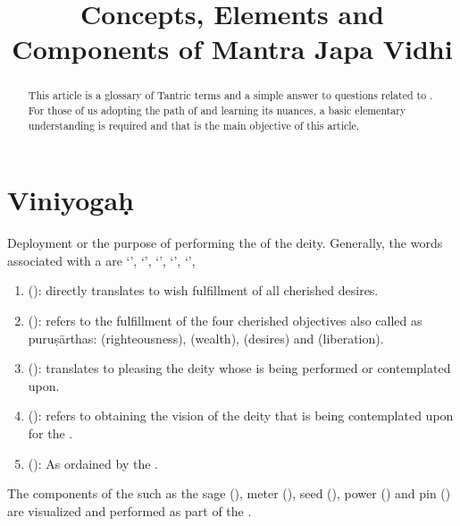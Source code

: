 \documentclass[twoside]{xarticle}
\title{Concepts, Elements and Components of Mantra Japa Vidhi}
\author{\relax}
\date{\relax}
\begin{document}

\thispagestyle{empty}
\maketitle
\tableofcontents

\clearpage

\pagestyle{fancy}
\thispagestyle{empty}

\begin{abstract}\noindent
  This article is a glossary of Tantric terms and a simple answer to questions
  related to . For those of us adopting the path of
   and learning its nuances, a basic elementary understanding
  is required and that is the main objective of this article.
\end{abstract}

\section{Viniyogaḥ}
Deployment or the purpose of performing the  of the deity.
Generally, the words associated with a  are
‘’, ‘’,
‘’, ‘’,
‘’, \etc

\begin{enumerate}
  \item {} (): directly translates to wish fulfillment of all cherished desires.
  \item {} (): refers to the fulfillment of the four cherished objectives also called as puruṣārthas:  (righteousness),  (wealth),  (desires) and  (liberation).
  \item {} (): translates to pleasing the deity whose  is being performed or contemplated upon.
  \item {} (): refers to obtaining the vision of the deity that is being contemplated upon for the .
  \item {} (): As ordained by the .
\end{enumerate}

The components of the  such as the sage (),
meter (), seed (), power () and pin ()
are visualized and performed as part of the .
\end{document}

